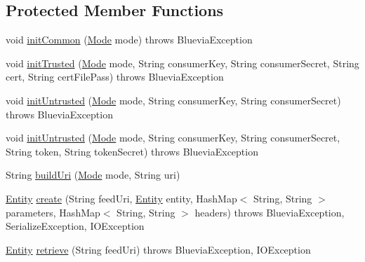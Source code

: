 \subsection*{Protected Member Functions}
\begin{DoxyCompactItemize}
\item 
void \hyperlink{classcom_1_1bluevia_1_1commons_1_1client_1_1BVBaseClient_aa6d73f00d722c07cc5c77feee9c0be63}{initCommon} (\hyperlink{classcom_1_1bluevia_1_1commons_1_1client_1_1BVBaseClient_a5f4a4a27d73a8ddd0ce450a6c7a4d1b7}{Mode} mode)  throws BlueviaException
\item 
void \hyperlink{classcom_1_1bluevia_1_1commons_1_1client_1_1BVBaseClient_a643da17fba6a72bd43fec08c6888dbff}{initTrusted} (\hyperlink{classcom_1_1bluevia_1_1commons_1_1client_1_1BVBaseClient_a5f4a4a27d73a8ddd0ce450a6c7a4d1b7}{Mode} mode, String consumerKey, String consumerSecret, String cert, String certFilePass)  throws BlueviaException
\item 
void \hyperlink{classcom_1_1bluevia_1_1commons_1_1client_1_1BVBaseClient_a3509212e3cbd81a56e4de3df75bcebdb}{initUntrusted} (\hyperlink{classcom_1_1bluevia_1_1commons_1_1client_1_1BVBaseClient_a5f4a4a27d73a8ddd0ce450a6c7a4d1b7}{Mode} mode, String consumerKey, String consumerSecret)  throws BlueviaException
\item 
void \hyperlink{classcom_1_1bluevia_1_1commons_1_1client_1_1BVBaseClient_adb8c7a9e60a2700c5b552b211dab28ac}{initUntrusted} (\hyperlink{classcom_1_1bluevia_1_1commons_1_1client_1_1BVBaseClient_a5f4a4a27d73a8ddd0ce450a6c7a4d1b7}{Mode} mode, String consumerKey, String consumerSecret, String token, String tokenSecret)  throws BlueviaException
\item 
String \hyperlink{classcom_1_1bluevia_1_1commons_1_1client_1_1BVBaseClient_aadc6f63134b4ed1fde26186130f025c4}{buildUri} (\hyperlink{classcom_1_1bluevia_1_1commons_1_1client_1_1BVBaseClient_a5f4a4a27d73a8ddd0ce450a6c7a4d1b7}{Mode} mode, String uri)
\item 
\hyperlink{interfacecom_1_1bluevia_1_1commons_1_1Entity}{Entity} \hyperlink{classcom_1_1bluevia_1_1commons_1_1client_1_1BVBaseClient_a7a76492352a25fcedbebc5aa29b9be7e}{create} (String feedUri, \hyperlink{interfacecom_1_1bluevia_1_1commons_1_1Entity}{Entity} entity, HashMap$<$ String, String $>$ parameters, HashMap$<$ String, String $>$ headers)  throws BlueviaException, SerializeException, IOException 
\item 
\hyperlink{interfacecom_1_1bluevia_1_1commons_1_1Entity}{Entity} \hyperlink{classcom_1_1bluevia_1_1commons_1_1client_1_1BVBaseClient_a4f777f58dcb633915f3fbee4fc16b002}{retrieve} (String feedUri)  throws BlueviaException, IOException 

\end{DoxyCompactItemize}
